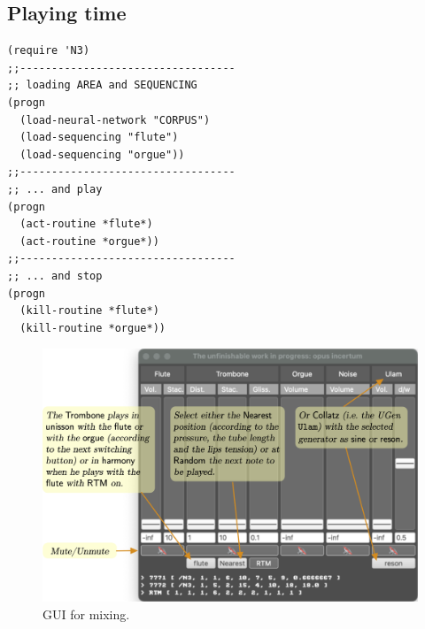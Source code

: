 \documentclass{article}
\begin{document}
\subsection{Playing time}

\begin{lstlisting}[language=N3]
(require 'N3)
;;----------------------------------
;; loading AREA and SEQUENCING
(progn
  (load-neural-network "CORPUS")
  (load-sequencing "flute")
  (load-sequencing "orgue"))
;;----------------------------------
;; ... and play
(progn
  (act-routine *flute*)
  (act-routine *orgue*))
;;----------------------------------
;; ... and stop
(progn
  (kill-routine *flute*)
  (kill-routine *orgue*))
\end{lstlisting}

\begin{figure}[H]
\centering
\includegraphics[width=\textwidth]{../img/9932}
\caption*{GUI for mixing.}
\label{guiemix}
\end{figure}
\end{document}
